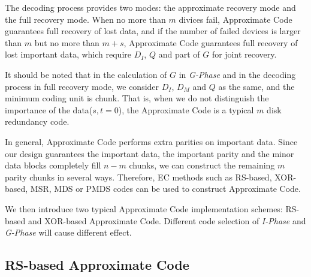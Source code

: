 \documentclass[sigconf]{acmart}
\begin{document}
The decoding process provides two modes: the approximate recovery mode and the full recovery mode.
When no more than $m$ divices fail, Approximate Code guarantees full recovery of lost data, and if the number of failed devices is larger than $m$ but no more than $m+s$, Approximate Code guarantees full recovery of lost important data, which require $D_I$, $Q$ and part of $G$ for joint recovery.

It should be noted that in the calculation of $G$ in \emph{G-Phase} and in the decoding process in full recovery mode, we consider $D_I$, $D_M$ and $Q$ as the same, and the minimum coding unit is chunk. That is, when we do not distinguish the importance of the data($s,t = 0$), the Approximate Code is a typical $m$ disk redundancy code.

In general, Approximate Code performs extra parities on important data.
Since our design guarantees the important data, the important parity and the minor data blocks completely fill $n-m$ chunks, we can construct the remaining $m$ parity chunks in several ways. Therefore, EC methods such as RS-based, XOR-based, MSR, MDS or PMDS codes can be used to construct Approximate Code. 

We then introduce two typical Approximate Code implementation schemes: RS-based and XOR-based Approximate Code. Different code selection of \emph{I-Phase} and \emph{G-Phase} will cause different effect.

\subsection{RS-based Approximate Code}
\end{document}
